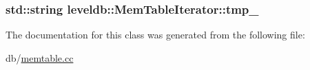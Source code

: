 \subsubsection[{tmp\+\_\+}]{\setlength{\rightskip}{0pt plus 5cm}std\+::string leveldb\+::\+Mem\+Table\+Iterator\+::tmp\+\_\+\hspace{0.3cm}{\ttfamily [private]}}\label{classleveldb_1_1_mem_table_iterator_a2f53089f1ea63c06c3719a4bce50a076}


The documentation for this class was generated from the following file\+:\begin{DoxyCompactItemize}
\item 
db/\hyperlink{memtable_8cc}{memtable.\+cc}\end{DoxyCompactItemize}
